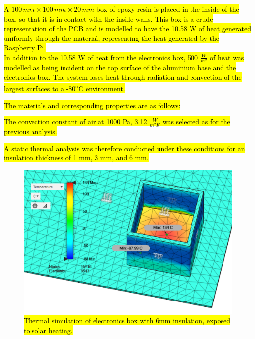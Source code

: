 \hl{A $100\,mm \times 100\,mm \times 20\,mm$ box of epoxy resin is placed in the inside of the box, so that it is in contact with the inside walls. This box is a crude representation of the PCB and is modelled to have the 10.58 W of heat generated uniformly through the material, representing the heat generated by the Raspberry Pi.} \\

\hl{In addition to the 10.58 W of heat from the electronics box, 500 $\frac{W}{m^{2}}$ of heat was modelled as being incident on the top surface of the aluminium base and the electronics box. The system loses heat through radiation and convection of the largest surfaces to a -80\textsuperscript{o}C environment.}

\hl{The materials and corresponding properties are as follows:}



\hl{The convection constant of air at 1000 Pa, 3.12 $\frac{W}{m^2 K} $ was selected as for the previous analysis.}

\hl{A static thermal analysis was therefore conducted under these conditions for an insulation thickness of 1 mm, 3 mm, and 6 mm.} 

	\begin{figure}[H]
    \centering	
	\includegraphics[scale=0.58]{4-experiment-design/img/mechanical/6mmthickheat.PNG}
	\caption{\hl{Thermal simulation of electronics box with 6mm insulation, exposed to solar heating.}}
	\label{fig:6mmthickheat}
    	\end{figure}

